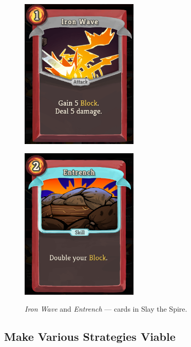 \begin{figure}
    \centering
    \begin{minipage}{.5\textwidth}
        \centering
        \includegraphics[width=0.5\textwidth]{img/Slay-the-Spire-Iron-Wave.png}
        \label{fig:slay-the-spire-iron-wave}
    \end{minipage}%
    \begin{minipage}{.5\textwidth}
        \centering
        \captionsetup{justification=centering}
        \includegraphics[width=0.5\textwidth]{img/Slay-the-Spire-Entrench.png}
        \label{fig:slay-the-spire-entrench}
    \end{minipage}
    \caption{\emph{Iron Wave} and \emph{Entrench} --- cards in Slay the Spire.}
\end{figure}

\subsection{Make Various Strategies Viable}

